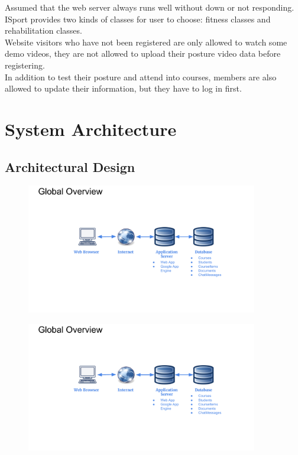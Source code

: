 \documentclass[16pt]{scrreprt}
\begin{document}
 
Assumed that the web server always runs well without down or not responding.\\

 
ISport provides two kinds of classes for user to choose: fitness classes and rehabilitation classes.\\

 
Website visitors who have not been registered are only allowed to watch some demo videos, they are not allowed to upload their posture video data before registering.\\

 
In addition to test their posture and attend into courses, members are also allowed to update their information, but they have to log in first.\\

\chapter{System Architecture}

\section{Architectural Design}

\begin{figure}[ht]
  \centering
  \includegraphics[page=1,width=0.9\textwidth]{diagrams/SDD_Diagrams.pdf}
  \label{fig:SDD_1}
\end{figure}

\begin{figure}[ht]
  \centering
  \includegraphics[page=2,width=0.9\textwidth]{diagrams/SDD_Diagrams.pdf}
  \label{fig:SDD_1}
\end{figure}
\end{document}
